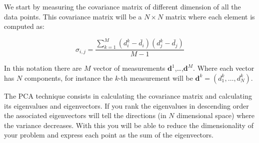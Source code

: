 \documentclass{article}
\begin{document}
We start by measuring the covariance matrix of different dimension of all the data points. This covariance matrix will be a $N\times N$ matrix where each element is computed as:

\begin{equation}
\sigma_{i,j} = \frac{\sum_{k=1}^{M} (d^{k}_i - \bar{d_i})(d^{k}_j -\bar{d_{j}})}{M-1}
\end{equation}

In this notation there are $M$ vector of measurements ${\mathbf d}^{1}$,\ldots,${\mathbf d}^{M}$. Where each vector has $N$ components, for instance the $k$-th measurement will be ${\mathbf d}^{k}=(d^k_{1},\ldots,d^k_{N})$.

The PCA technique consists in calculating the covariance matrix and calculating its eigenvalues and eigenvectors. If you rank the eigenvalues in descending order the associated eigenvectors will tell the directions (in $N$ dimensional space) where the variance decreases. With this you will be able to reduce the dimensionality of your problem and express each point as the sum of the eigenvectors.
\end{document}
